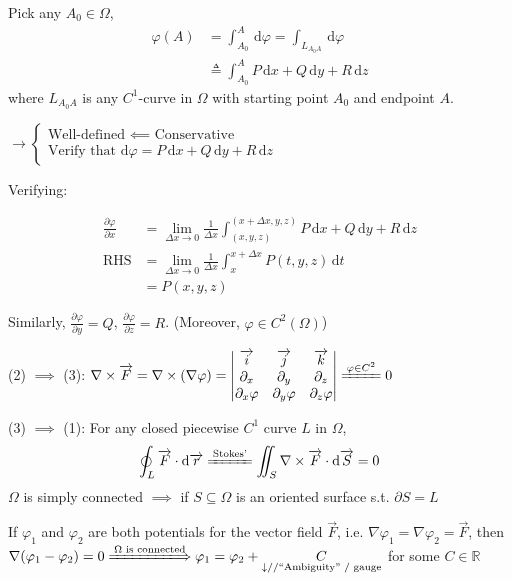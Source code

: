 Pick any $A_0\in\Omega$,
\begin{align*}
    \varphi(A) & =\int_{A_0}^A\,\mathrm{d}\varphi=\int_{L_{A_0A}}\,\mathrm{d}\varphi \\
               & \triangleq\int_{A_0}^A P\,\mathrm{d}x+Q\,\mathrm{d}y+R\,\mathrm{d}z
\end{align*}
where $L_{A_0A}$ is any $C^1$-curve in $\Omega$ with starting point $A_0$ and endpoint $A$.

$\rightarrow\begin{cases}
        \text{Well-defined }\impliedby\text{ Conservative} \\
        \text{Verify that }\mathrm{d}\varphi=P\,\mathrm{d}x+Q\,\mathrm{d}y+R\,\mathrm{d}z
    \end{cases}$

Verifying:

\begin{align*}
    \frac{\partial\varphi}{\partial x} & =\lim_{\Delta x\to 0}\frac{1}{\Delta x}\int_{(x,y,z)}^{(x+\Delta x,y,z)}P\,\mathrm{d}x+Q\,\mathrm{d}y+R\,\mathrm{d}z \\
    \text{RHS}                         & =\lim_{\Delta x\to 0}\frac{1}{\Delta x}\int_x^{x+\Delta x}P(t,y,z)\,\mathrm{d}t                                      \\
                                       & =P(x,y,z)
\end{align*}

Similarly, $\frac{\partial\varphi}{\partial y}=Q$, $\frac{\partial\varphi}{\partial z}=R$. (Moreover, $\varphi\in C^2(\Omega)$)

(2) $\implies$ (3): $\nabla\times\overrightarrow{F}=\nabla\times(\nabla\varphi)=\begin{vmatrix}
        \overrightarrow{i} & \overrightarrow{j} & \overrightarrow{k} \\
        \partial_x         & \partial_y         & \partial_z         \\
        \partial_x\varphi  & \partial_y\varphi  & \partial_z\varphi
    \end{vmatrix}\xlongequal{\varphi\in C^2}0$

(3) $\implies$ (1): For any closed piecewise $C^1$ curve $L$ in $\Omega$,
$$\oint_L\overrightarrow{F}\cdot\mathrm{d}\overrightarrow{r}\xlongequal{\text{Stokes'}}\iint_S\nabla\times\overrightarrow{F}\cdot\mathrm{d}\overrightarrow{S}=0$$
$\Omega$ is simply connected $\implies$ if $S\subseteq\Omega$ is an oriented surface s.t. $\partial S=L$

\begin{remark}
    If $\varphi_1$ and $\varphi_2$ are both potentials for the vector field $\overrightarrow{F}$, i.e. $\nabla\varphi_1=\nabla\varphi_2=\overrightarrow{F}$, then $\nabla(\varphi_1-\varphi_2)=0\xLongrightarrow{\Omega\text{ is connected}}\varphi_1=\varphi_2+\underset{\substack{\downarrow//\text{``Ambiguity'' / gauge}}}{C}$ for some $C\in\mathbb{R}$
\end{remark}

